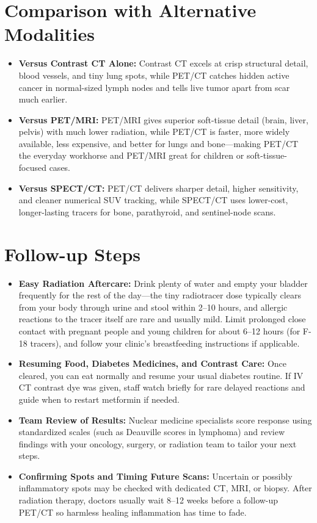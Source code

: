 \section{Comparison with Alternative Modalities}

\begin{itemize}
    \item \textbf{Versus Contrast CT Alone:} Contrast CT excels at crisp structural detail, blood vessels, and tiny lung spots, while PET/CT catches hidden active cancer in normal-sized lymph nodes and tells live tumor apart from scar much earlier.
    \item \textbf{Versus PET/MRI:} PET/MRI gives superior soft-tissue detail (brain, liver, pelvis) with much lower radiation, while PET/CT is faster, more widely available, less expensive, and better for lungs and bone---making PET/CT the everyday workhorse and PET/MRI great for children or soft-tissue-focused cases.
    \item \textbf{Versus SPECT/CT:} PET/CT delivers sharper detail, higher sensitivity, and cleaner numerical SUV tracking, while SPECT/CT uses lower-cost, longer-lasting tracers for bone, parathyroid, and sentinel-node scans.
\end{itemize}

\section{Follow-up Steps}

\begin{itemize}
    \item \textbf{Easy Radiation Aftercare:} Drink plenty of water and empty your bladder frequently for the rest of the day---the tiny radiotracer dose typically clears from your body through urine and stool within 2--10 hours, and allergic reactions to the tracer itself are rare and usually mild. Limit prolonged close contact with pregnant people and young children for about 6--12 hours (for F-18 tracers), and follow your clinic's breastfeeding instructions if applicable.
    \item \textbf{Resuming Food, Diabetes Medicines, and Contrast Care:} Once cleared, you can eat normally and resume your usual diabetes routine. If IV CT contrast dye was given, staff watch briefly for rare delayed reactions and guide when to restart metformin if needed.
    \item \textbf{Team Review of Results:} Nuclear medicine specialists score response using standardized scales (such as Deauville scores in lymphoma) and review findings with your oncology, surgery, or radiation team to tailor your next steps.
    \item \textbf{Confirming Spots and Timing Future Scans:} Uncertain or possibly inflammatory spots may be checked with dedicated CT, MRI, or biopsy. After radiation therapy, doctors usually wait 8--12 weeks before a follow-up PET/CT so harmless healing inflammation has time to fade.
\end{itemize}

